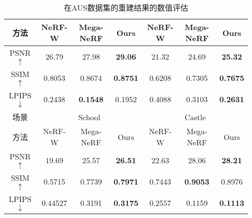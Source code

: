 \begin{table}[p]
{\begin{tabular}{ccccccc}
方法    & NeRF-W  & Mega-NeRF       & Ours            & NeRF-W & Mega-NeRF       & Ours            \\ \hline
PSNR $\uparrow$  & 26.79   & 27.98           & \textbf{29.06}  & 21.32  & 24.69           & \textbf{25.32}  \\
SSIM $\uparrow$  & 0.8053  & 0.8674          & \textbf{0.8751} & 0.6208 & 0.7305          & \textbf{0.7675} \\
LPIPS $\downarrow$ & 0.2438  & \textbf{0.1548} & 0.1952          & 0.4088 & 0.3103          & \textbf{0.2631} \\ \hline
场景    & \multicolumn{3}{c}{School}                  & \multicolumn{3}{c}{Castle}                 \\ \cline{2-7} 
方法    & NeRF-W  & Mega-NeRF       & Ours            & NeRF-W & Mega-NeRF       & Ours            \\ \hline
PSNR $\uparrow$  & 19.69   & 25.57           & \textbf{26.51}  & 22.63  & 28.06           & \textbf{28.21}  \\
SSIM $\uparrow$  & 0.5715  & 0.7739          & \textbf{0.7971} & 0.7443 & \textbf{0.9053} & 0.8976          \\
LPIPS $\downarrow$ & 0.44527 & 0.3191          & \textbf{0.3175} & 0.2557 & 0.1159          & \textbf{0.1113} \\ \hline
\end{tabular}%
}
\caption{在AUS数据集的重建结果的数值评估}
\label{tab: aus-nvs-quant}
\end{table}